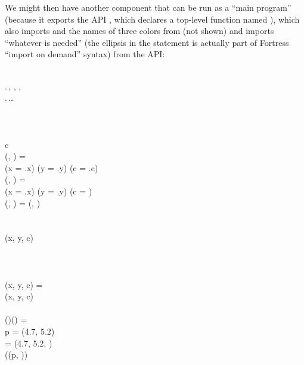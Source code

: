 We might then have another component that can be run as a ``main program''
(because it exports the API , which declares a top-level
function named ), which also imports  and the
names of three colors from  (not shown)
and imports ``whatever is needed'' (the ellipsis \EXP{\ldots} in the  statement
is actually part of Fortress ``import on demand'' syntax) from the  API:
\begin{codeexamplesize}
\begin{FortressCode}
  \\
 .\lbrace\,, , , \,\rbrace \\
 .\lbrace\,\ldots\,\rbrace \\
  \\
 \\
    \\
\2\+c\COLON {} \\
  (, \COLON {})\COLON {} = \\
  \2\+(x = .x) \wedge (y = .y) \wedge (c = .c)\- \\
  (, \COLON {})\COLON {} = \\
  \2\+(x = .x) \wedge (y = .y) \wedge (c = )\- \\
  (\COLON {}, )\COLON {} = (, )\- \\
 \\
 \\
 (x\COLON {}, y\COLON {}, c\COLON {}) \\
\2\2\2\+ \- \\
 \\
 \\
(x\COLON {}, y\COLON {}, c\COLON {}) = \\
\2\+(x, y, c) \\
\- \\
(\ultrathin)\COLON (\ultrathin) =\;  \\
\2\+p = (4.7, 5.2) \\
   = (4.7, 5.2, ) \\
  \bigl((p, )\bigr)\- \\
 \\
 \\
 
\end{FortressCode}
\end{codeexamplesize}

